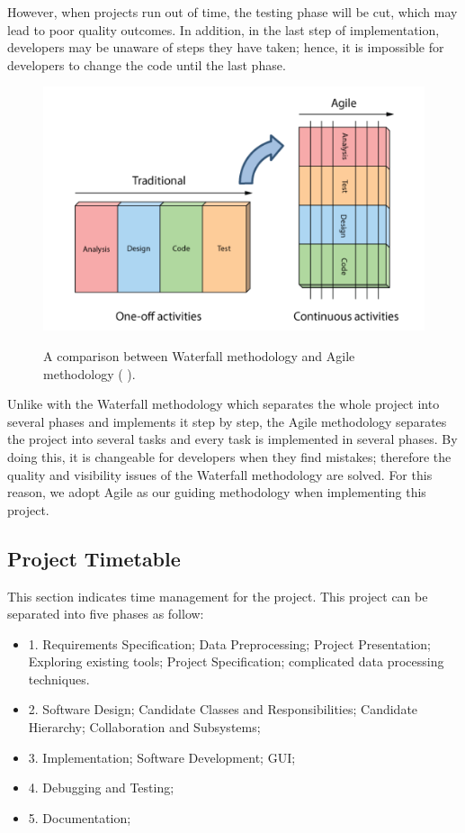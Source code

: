 However, when projects run out of time, the testing phase will be cut, which may lead to poor quality outcomes. In addition, in the last step of implementation, developers may be unaware of steps they have taken; hence, it is impossible for developers to change the code until the last phase.

\begin{figure}[H]
	\centering    
	\includegraphics[scale=1]{Figs/Waterfull-Agile}\\[1ex]
	\caption{A comparison between Waterfall methodology and Agile methodology ( \cite{AgileVsWaterfall}).}
	\label{fig:waterfallAgile}
\end{figure}

Unlike with the Waterfall methodology which separates the whole project into several phases and implements it step by step, the Agile methodology separates the project into several tasks and every task is implemented in several phases. By doing this, it is changeable for developers when they find mistakes; therefore the quality and visibility issues of the Waterfall methodology are solved. For this reason, we adopt Agile as our guiding methodology when implementing this project.

\subsection{Project Timetable}

This section indicates time management for the project. This project can be separated into five phases  \cite{Laramee} as follow:

\begin{itemize}
	\item {1. }Requirements Specification; 
	Data Preprocessing; 
	Project Presentation;
	Exploring existing tools; 
	Project Specification; 
	complicated data processing techniques.
	\item {2. }Software Design;
	Candidate Classes and Responsibilities;
	Candidate Hierarchy;
	Collaboration and Subsystems;
	\item {3. }Implementation;
	Software Development;
	GUI;
	\item {4. }Debugging and Testing;
	\item {5. }Documentation;
\end{itemize}

